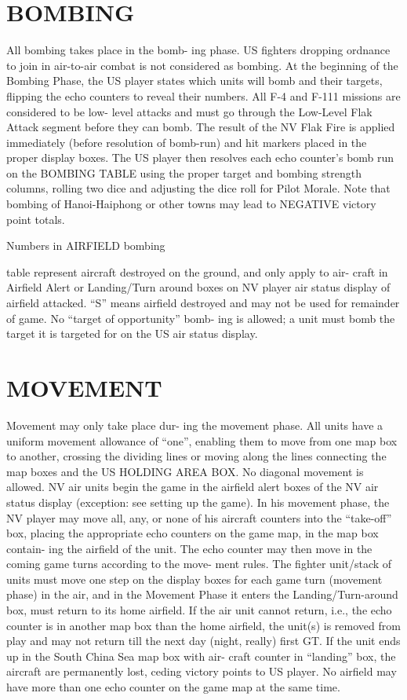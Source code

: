 \section*{BOMBING}
All bombing takes place in the bomb-
ing phase. US fighters dropping
ordnance to join in air-to-air combat is
not considered as bombing.
At the beginning of the Bombing
Phase, the US player states which
units will bomb and their targets,
flipping the echo counters to reveal
their numbers. All F-4 and F-111
missions are considered to be low-
level attacks and must go through the
Low-Level Flak Attack segment before
they can bomb. The result of the NV
Flak Fire is applied immediately
(before resolution of bomb-run) and
hit markers placed in the proper
display boxes.
The US player then resolves each
echo counter’s bomb run on the
BOMBING TABLE using the proper
target and bombing strength columns,
rolling two dice and adjusting the
dice roll for Pilot Morale. Note that
bombing of Hanoi-Haiphong or other
towns may lead to NEGATIVE
victory point totals.

Numbers in AIRFIELD bombing

\newpage

table represent aircraft destroyed on
the ground, and only apply to air-
craft in Airfield Alert or Landing/Turn
around boxes on NV player air status
display of airfield attacked. “S”
means airfield destroyed and may not
be used for remainder of game.
No “target of opportunity” bomb-
ing is allowed; a unit must bomb the
target it is targeted for on the US air
status display.

\section*{MOVEMENT}
Movement may only take place dur-
ing the movement phase. All units
have a uniform movement allowance
of “one”, enabling them to move
from one map box to another, crossing
the dividing lines or moving along the
lines connecting the map boxes and
the US HOLDING AREA BOX. No
diagonal movement is allowed.
NV air units begin the game in the
airfield alert boxes of the NV air
status display (exception: see setting
up the game). In his movement
phase, the NV player may move all,
any, or none of his aircraft counters
into the “take-off” box, placing the
appropriate echo counters on the
game map, in the map box contain-
ing the airfield of the unit. The echo
counter may then move in the coming
game turns according to the move-
ment rules. The fighter unit/stack of
units must move one step on the
display boxes for each game turn
(movement phase) in the air, and in
the Movement Phase it enters the
Landing/Turn-around box, must
return to its home airfield. If the air
unit cannot return, i.e., the echo
counter is in another map box than
the home airfield, the unit(s) is
removed from play and may not
return till the next day (night, really)
first GT. If the unit ends up in the
South China Sea map box with air-
craft counter in “landing” box, the
aircraft are permanently lost, ceding
victory points to US player.
No airfield may have more than one
echo counter on the game map at
the same time.

